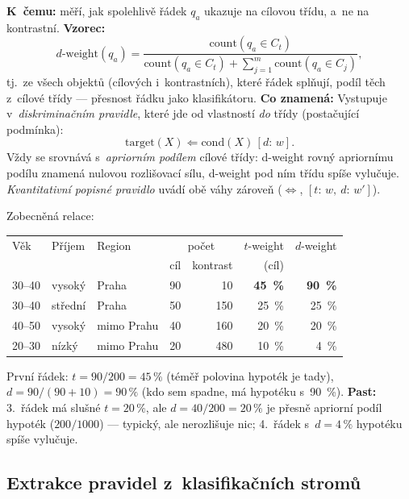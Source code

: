 \documentclass[11pt,a4paper]{article}
\theoremstyle{definition}
\begin{document}
\begin{defbox}
\textbf{K~čemu:} měří, jak spolehlivě řádek $q_a$ ukazuje na cílovou třídu, a~ne na
kontrastní. \textbf{Vzorec:}
\[ d\text{-}\mathrm{weight}(q_a)=\frac{\mathrm{count}(q_a\in C_t)}
   {\mathrm{count}(q_a\in C_t)+\sum_{j=1}^{m}\mathrm{count}(q_a\in C_j)}, \]
tj.\ ze všech objektů (cílových i~kontrastních), které řádek splňují, podíl těch
z~cílové třídy --- přesnost řádku jako klasifikátoru. \textbf{Co znamená:}  Vystupuje v~\emph{diskriminačním
pravidle}, které jde od vlastností \emph{do} třídy (postačující podmínka):
\[ \mathrm{target}(X)\Leftarrow \mathrm{cond}(X)\,[d{:}\,w]. \]
Vždy se srovnává s~\emph{apriorním podílem} cílové třídy: d-weight rovný apriornímu
podílu znamená nulovou rozlišovací sílu, d-weight pod ním třídu spíše vylučuje.
\emph{Kvantitativní popisné pravidlo} uvádí obě váhy zároveň ($\Leftrightarrow$,
$[t{:}\,w,\ d{:}\,w']$).
\end{defbox}

\begin{defbox}
Zobecněná relace:
\begin{center}
\small
\begin{tabular}{@{}lllrrrr@{}}
\toprule
Věk & Příjem & Region & \multicolumn{2}{c}{počet} & $t$-weight & $d$-weight \\
 & & & cíl & kontrast & (cíl) & \\
\midrule
30--40 & vysoký & Praha & 90 & 10 & \textbf{45~\%} & \textbf{90~\%} \\
30--40 & střední & Praha & 50 & 150 & 25~\% & 25~\% \\
40--50 & vysoký & mimo Prahu & 40 & 160 & 20~\% & 20~\% \\
20--30 & nízký & mimo Prahu & 20 & 480 & 10~\% & 4~\% \\
\bottomrule
\end{tabular}
\end{center}
První řádek: $t=90/200=45\,\%$ (téměř polovina hypoték je tady),
$d=90/(90+10)=90\,\%$ (kdo sem spadne, má hypotéku s~90~\%).
\textbf{Past:} 3.~řádek má slušné $t=20\,\%$, ale $d=40/200=20\,\%$ je přesně apriorní
podíl hypoték ($200/1000$) --- typický, ale nerozlišuje nic; 4.~řádek s~$d=4\,\%$
hypotéku spíše vylučuje.
\end{defbox}

\subsection{Extrakce pravidel z~klasifikačních stromů}
\label{ssec:extrakce}
\end{document}
